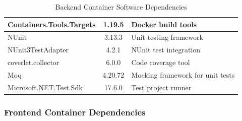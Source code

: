 \begin{table}[H]
\begin{tabularx}{\textwidth}{|X|c|p{}|}
        Containers.Tools.Targets                & 1.19.5           & Docker build tools                            \\
        \hline
        NUnit                                   & 3.13.3           & Unit testing framework                        \\
        \hline
        NUnit3TestAdapter                       & 4.2.1            & NUnit test integration                        \\
        \hline
        coverlet.collector                      & 6.0.0            & Code coverage tool                            \\
        \hline
        Moq                                     & 4.20.72          & Mocking framework for unit tests              \\
        \hline
        Microsoft.NET.Test.Sdk                  & 17.6.0           & Test project runner                           \\
        \hline
    \end{tabularx}
    \caption{Backend Container Software Dependencies}
    \label{tab:backend_dependencies}
\end{table}


\subsubsection{Frontend Container Dependencies}

